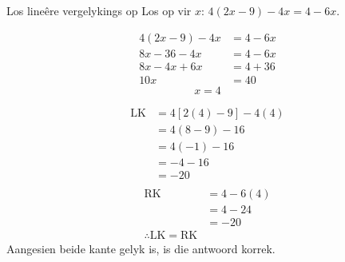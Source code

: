 \begin{wex}{Los line\^ere vergelykings op }
{Los op vir $x$: $4(2x-9)-4x=4-6x$.}
{
\begin{align*}
  4(2x-9)-4x &= 4-6x \\
  8x-36-4x &= 4-6x \\
  8x-4x+6x &= 4+36 \\
  10x &= 40
\end{align*}
\begin{equation*}
  x = 4
\end{equation*}


\begin{equation*}
    \begin{array}{ccl}
  \mbox{LK} &= 4\left[2(4)-9\right]-4(4)\\
  &=4(8-9)-16\\
  &=4(-1)-16\\
  &=-4-16\\
  &=-20\\
    \end{array}
\end{equation*}
\begin{equation*}
    \begin{array}{ccl}
\mbox{RK} &= 4-6(4) \\
  &= 4-24 \\
  &= -20 \\
\therefore \mbox{LK} = \mbox{RK}
    \end{array}
\end{equation*}
Aangesien beide kante gelyk is, is die antwoord korrek.
}
\end{wex}

